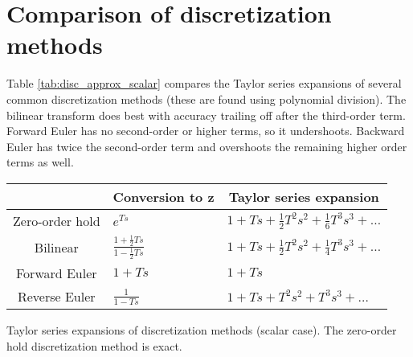 \section{Comparison of discretization methods}

Table \ref{tab:disc_approx_scalar} compares the Taylor series expansions of
several common discretization methods (these are found using polynomial
division). The bilinear transform does best with accuracy trailing off after the
third-order term. Forward Euler has no second-order or higher terms, so it
undershoots. Backward Euler has twice the second-order term and overshoots the
remaining higher order terms as well.
\begin{booktable}
  \begin{tabular}{|cll|}
    \hline
    \rowcolor{headingbg}
    \multicolumn{1}{|c}{\textbf{Method}} &
      \multicolumn{1}{c}{\textbf{Conversion to z}} &
      \multicolumn{1}{c|}{\textbf{Taylor series expansion}} \\
    \hline
    Zero-order hold &
      $e^{Ts}$ &
      $1 + Ts + \frac{1}{2}T^2s^2 + \frac{1}{6}T^3s^3 + \ldots$ \\
    Bilinear &
      $\frac{1 + \frac{1}{2}Ts}{1 - \frac{1}{2}Ts}$ &
      $1 + Ts + \frac{1}{2}T^2s^2 + \frac{1}{4}T^3s^3 + \ldots$ \\
    Forward Euler &
      $1 + Ts$ &
      $1 + Ts$ \\
    Reverse Euler &
      $\frac{1}{1 - Ts}$ &
      $1 + Ts + T^2s^2 + T^3s^3 + \ldots$ \\
    \hline
  \end{tabular}
  \caption{Taylor series expansions of discretization methods (scalar case). The
    zero-order hold discretization method is exact.}
  \label{tab:disc_approx_scalar}
\end{booktable}
